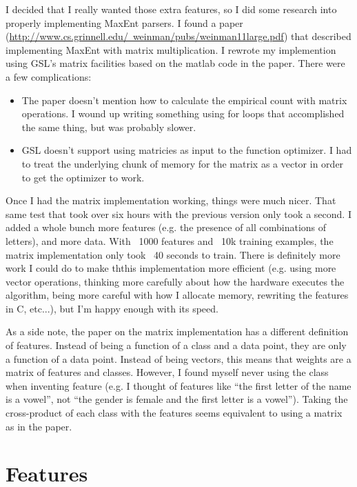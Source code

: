 \documentclass{article}
\begin{document}
I decided that I really wanted those extra features, so I did some research into properly implementing MaxEnt parsers. I found a paper (\href{Weinman, 11}{http://www.cs.grinnell.edu/~weinman/pubs/weinman11large.pdf}) that described implementing MaxEnt with matrix multiplication. I rewrote my implemention using GSL's matrix facilities based on the matlab code in the paper. There were a few complications:

\begin{itemize}
\item The paper doesn't mention how to calculate the empirical count with matrix operations. I wound up writing something using for loops that accomplished the same thing, but was probably slower.
\item GSL doesn't support using matricies as input to the function optimizer. I had to treat the underlying chunk of memory for the matrix as a vector in order to get the optimizer to work.
\end{itemize}

Once I had the matrix implementation working, things were much nicer. That same test that took over six hours with the previous version only took a second. I added a whole bunch more features (e.g. the presence of all combinations of letters), and more data. With ~1000 features and ~10k training examples, the matrix implementation only took ~40 seconds to train. There is definitely more work I could do to make ththis implementation more efficient (e.g. using more vector operations, thinking more carefully about how the hardware executes the algorithm, being more careful with how I allocate memory, rewriting the features in C, etc...), but I'm happy enough with its speed.

As a side note, the paper on the matrix implementation has a different definition of features. Instead of being a function of a class and a data point, they are only a function of a data point. Instead of being vectors, this means that weights are a matrix of features and classes. However, I found myself never using the class when inventing feature (e.g. I thought of features like ``the first letter of the name is a vowel'', not ``the gender is female and the first letter is a vowel''). Taking the cross-product of each class with the features seems equivalent to using a matrix as in the paper.

\section{Features}
\end{document}
